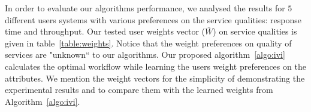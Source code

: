 \documentclass[10pt,journal,compsoc]{IEEEtran}
\begin{document}
In order to evaluate our algorithms performance, we analysed the results for $5$ different users systems with various preferences on the service qualities: response time and throughput. Our tested user weights vector ($\bar{W}$) on service qualities is given in table~\ref{table:weights}. Notice that the weight preferences on quality of services are "unknown`` to our algorithms. Our proposed algorithm~\ref{algo:ivi} calculates the optimal workflow while learning the users weight preferences on the attributes. We mention the weight vectors for the simplicity of demonstrating the experimental results and to compare them with the learned weights from Algorithm~\ref{algo:ivi}.

\begin{table}[ht]
\caption{This table demonstrates how each predicted service composition from algorithm \ref{algo:ivi} is different from the exact service composition for $W_2$.}
\centering
{}
\end{table}
\end{document}
